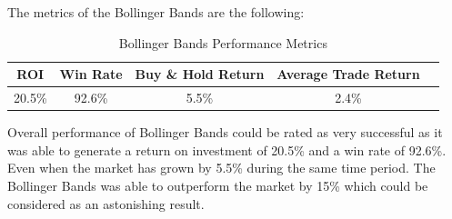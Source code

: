 \documentclass{imc-inf}
\begin{document}
	The metrics of the Bollinger Bands are the following:
	\begin{table}[h!]
		\centering
		\begin{tabular}{|c|c|c|c|c|}
			\hline
			\textbf{ROI} & \textbf{Win Rate} & \textbf{Buy \& Hold Return} & \textbf{Average Trade Return} \\ \hline
			20.5\%         & 92.6\%               & 5.5\%                         & 2.4\%                           \\ \hline
		\end{tabular}
		\caption{Bollinger Bands Performance Metrics}
		\label{tab:bollinger_bands_performance_metrics}
		
	\end{table}
	Overall performance of Bollinger Bands could be rated as very successful as it was able to generate a return on investment of 20.5\% and a win rate of 92.6\%.
	Even when the market has grown by 5.5\% during the same time period. The Bollinger Bands was able to outperform the market by 15\% which could be considered as
	an astonishing result.
\end{document}
